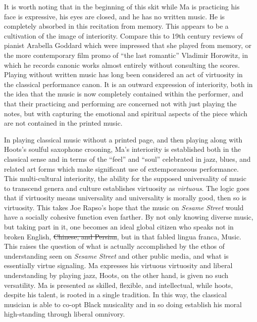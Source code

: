 \documentclass[12pt,letterpaper]{article}
\newcommand{\ses}{\textit{Sesame Street }}
\providecommand{\DIFadd}[1]{{\protect\color{blue}\uwave{#1}}} %
\providecommand{\DIFdel}[1]{{\protect\color{red}\sout{#1}}}                      %
\providecommand{\DIFaddbegin}{} %
\providecommand{\DIFaddend}{} %
\providecommand{\DIFdelbegin}{} %
\providecommand{\DIFdelend}{} %
\newcommand{\DIFscaledelfig}{0.5}
\newlength{\DIFdelgraphicswidth} %
\newlength{\DIFdelgraphicsheight} %
\newcommand{\DIFaddincludegraphics}[2][]{{\color{blue}\fbox{\DIFOincludegraphics[#1]{#2}}}} %
\newcommand{\DIFdelincludegraphics}[2][]{%
\sbox{\DIFdelgraphicsbox}{\DIFOincludegraphics[#1]{#2}}%
\settoboxwidth{\DIFdelgraphicswidth}{\DIFdelgraphicsbox} %
\settoboxtotalheight{\DIFdelgraphicsheight}{\DIFdelgraphicsbox} %
\scalebox{\DIFscaledelfig}{%
\parbox[b]{\DIFdelgraphicswidth}{\usebox{\DIFdelgraphicsbox}\\[-\baselineskip] \rule{\DIFdelgraphicswidth}{0em}}\llap{\resizebox{\DIFdelgraphicswidth}{\DIFdelgraphicsheight}{%
\setlength{\unitlength}{\DIFdelgraphicswidth}%
\begin{picture}(1,1)%
\thicklines\linethickness{2pt} %
{\color[rgb]{1,0,0}\put(0,0){\framebox(1,1){}}}%
{\color[rgb]{1,0,0}\put(0,0){\line( 1,1){1}}}%
{\color[rgb]{1,0,0}\put(0,1){\line(1,-1){1}}}%
\end{picture}%
}\hspace*{3pt}}} %
} %
\DeclareRobustCommand{\DIFaddbegin}{\DIFOaddbegin \let\includegraphics\DIFaddincludegraphics} %
\DeclareRobustCommand{\DIFaddend}{\DIFOaddend \let\includegraphics\DIFOincludegraphics} %
\DeclareRobustCommand{\DIFdelbegin}{\DIFOdelbegin \let\includegraphics\DIFdelincludegraphics} %
\DeclareRobustCommand{\DIFdelend}{\DIFOaddend \let\includegraphics\DIFOincludegraphics} %
\begin{document}
	It is worth noting that in the beginning of this skit while Ma is 
	practicing his face is expressive, his eyes are closed, and he has no 
	written music. He is completely absorbed in this recitation from memory.
	This appears to be a cultivation of the image of interiority. Compare
	this to 19th century reviews of pianist Arabella Goddard which were 
	impressed that she played from memory,\autocite{Goddard} or the more 
	contemporary film promo of ``the last romantic'' Vladimir Horowitz, in 
	which he records canonic works almost entirely without consulting the 
	scores. Playing without written music has long been considered an act of
	virtuosity in the classical performance canon. It is an outward 
	expression of interiority, both in the idea that the music is now 
	completely contained within the performer, and that their practicing and
	performing are concerned not with just playing the notes, but 
	with capturing the emotional and spiritual aspects of the piece which 
	are not contained in the printed music. 

	In playing classical music without a printed page, and then playing 
	along with Hoots's soulful saxophone crooning, Ma's interiority is 
	established both in the classical sense and in terms of the ``feel'' and
	``soul'' celebrated in jazz, blues, and related art forms which make 
	significant use of extemporaneous performance. This multi-cultural 
	interiority, the ability for the supposed universality of music to 
	transcend 
	genera and culture establishes virtuosity as \textit{virtuous}.
	The logic goes that if virtuosity means universality and universality is
	morally good, then so is virtuosity. This takes Joe Rapso's hope that 
	the music on \textit{Sesame Street} would have a socially cohesive 
	function even farther. By not only knowing diverse music, but taking 
	part in it, one becomes an ideal global citizen who speaks not in broken
	English, \DIFdelbegin \DIFdel{Chinese, and Persian}\DIFdelend \DIFaddbegin \DIFadd{Mandarin, and Farsi}\DIFaddend , but in that fabled lingua franca, Music.   
	This raises the question of what is actually accomplished by the ethos
	of understanding seen on \ses and other public media, and what is
	essentially virtue signaling. Ma expresses his virtuous virtuosity and 
	liberal understanding by playing jazz, Hoots, on the other hand, is 
	given no such versatility. Ma is presented as skilled, flexible, and 
	intellectual, while hoots, despite his talent, is rooted in a single 
	tradition. In this way, the classical musician is able to co-opt Black 
	musicality and in so doing establish his moral high-standing through 
	liberal omnivory. 
\end{document}
